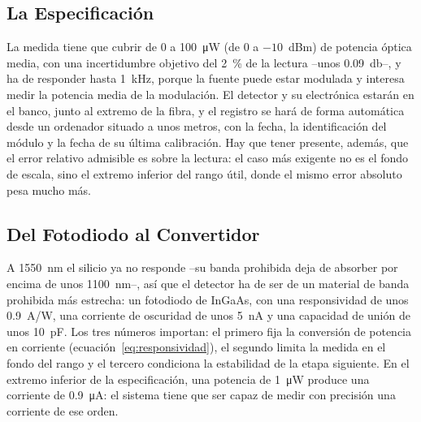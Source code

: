 \subsection{La Especificación}\label{sub:fibra_especificacion}

La medida tiene que cubrir de 0 a \SI{100}{\micro\watt} (de 0 a $-10$~dBm) de potencia óptica media, con una incertidumbre objetivo del \SI{2}{\percent} de la lectura --unos \SI{0.09}{\decibel}--, y ha de responder hasta \SI{1}{\kilo\hertz}, porque la fuente puede estar modulada y interesa medir la potencia media de la modulación. El detector y su electrónica estarán en el banco, junto al extremo de la fibra, y el registro se hará de forma automática desde un ordenador situado a unos metros, con la fecha, la identificación del módulo y la fecha de su última calibración. Hay que tener presente, además, que el error relativo admisible es sobre la lectura: el caso más exigente no es el fondo de escala, sino el extremo inferior del rango útil, donde el mismo error absoluto pesa mucho más.

\subsection{Del Fotodiodo al Convertidor}\label{sub:fibra_sensor}

A \SI{1550}{\nano\meter} el silicio ya no responde --su banda prohibida deja de absorber por encima de unos \SI{1100}{\nano\meter}--, así que el detector ha de ser de un material de banda prohibida más estrecha: un fotodiodo de InGaAs, con una responsividad de unos \qty{0.9}{A/W}, una corriente de oscuridad de unos \SI{5}{\nano\ampere} y una capacidad de unión de unos \SI{10}{\pico\farad}. Los tres números importan: el primero fija la conversión de potencia en corriente (ecuación~\eqref{eq:responsividad}), el segundo limita la medida en el fondo del rango y el tercero condiciona la estabilidad de la etapa siguiente. En el extremo inferior de la especificación, una potencia de \SI{1}{\micro\watt} produce una corriente de \SI{0.9}{\micro\ampere}: el sistema tiene que ser capaz de medir con precisión una corriente de ese orden.

